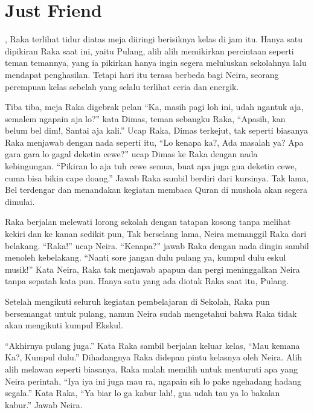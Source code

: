 \chapter*{Just Friend}

, Raka terlihat tidur diatas meja diiringi berisiknya kelas di jam itu. Hanya satu dipikiran Raka saat ini, yaitu Pulang, alih alih memikirkan percintaan seperti teman temannya, yang ia pikirkan hanya ingin segera meluluskan sekolahnya lalu mendapat penghasilan. Tetapi hari itu terasa berbeda bagi Neira, seorang perempuan kelas sebelah yang selalu terlihat ceria dan energik. 


Tiba tiba, meja Raka digebrak pelan ``Ka, masih pagi loh ini, udah ngantuk aja, semalem ngapain aja lo?'' kata Dimas, teman sebangku Raka, ``Apasih, kan belum bel dim!, Santai aja kali.'' Ucap Raka, Dimas terkejut, tak seperti biasanya Raka menjawab dengan nada seperti itu, ``Lo kenapa ka?, Ada masalah ya? Apa gara gara lo gagal deketin cewe?'' ucap Dimas ke Raka dengan nada kebingungan. ``Pikiran lo aja tuh cewe semua, buat apa juga gua deketin cewe, cuma bisa bikin cape doang.'' Jawab Raka sambil berdiri dari kursinya. Tak lama, Bel terdengar dan menandakan kegiatan membaca Quran di mushola akan segera dimulai.


Raka berjalan melewati lorong sekolah dengan tatapan kosong tanpa melihat kekiri dan ke kanan sedikit pun, Tak berselang lama, Neira memanggil Raka dari belakang. ``Raka!'' ucap Neira. ``Kenapa?'' jawab Raka dengan nada dingin sambil menoleh kebelakang. ``Nanti sore jangan dulu pulang ya, kumpul dulu eskul musik!'' Kata Neira, Raka tak menjawab apapun dan pergi meninggalkan Neira tanpa sepatah kata pun. Hanya satu yang ada diotak Raka saat itu, Pulang.


Setelah mengikuti seluruh kegiatan pembelajaran di Sekolah, Raka pun bersemangat untuk pulang, namun Neira sudah mengetahui bahwa Raka tidak akan mengikuti kumpul Ekskul.


``Akhirnya pulang juga.'' Kata Raka sambil berjalan keluar kelas, ``Mau kemana Ka?, Kumpul dulu.'' Dihadangnya Raka didepan pintu kelasnya oleh Neira. Alih alih melawan seperti biasanya, Raka malah memilih untuk menturuti apa yang Neira perintah, ``Iya iya ini juga mau ra, ngapain sih lo pake ngehadang hadang segala.'' Kata Raka, ``Ya biar lo ga kabur lah!, gua udah tau ya lo bakalan kabur.'' Jawab Neira.


